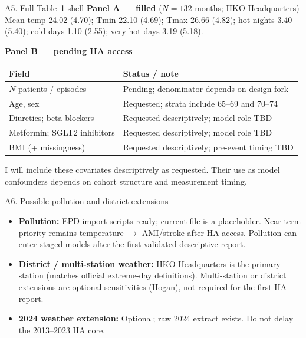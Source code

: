 \documentclass[aspectratio=169,10pt]{beamer}
\begin{document}
\begin{frame}{A5. Full Table~1 shell}
  \footnotesize
  \textbf{Panel A --- filled} ($N=132$ months; HKO Headquarters)\\[0.2em]
  Mean temp 24.02 (4.70); Tmin 22.10 (4.69); Tmax 26.66 (4.82);
  hot nights 3.40 (5.40); cold days 1.10 (2.55); very hot days 3.19 (5.18).

  \vspace{0.55em}
  \textbf{Panel B --- pending HA access}\\[0.2em]
  \begin{tabular}{@{}lp{8.6cm}@{}}
    \toprule
    Field & Status / note \\
    \midrule
    $N$ patients / episodes & Pending; denominator depends on design fork \\
    Age, sex & Requested; strata include 65--69 and 70--74 \\
    Diuretics; beta blockers & Requested descriptively; model role TBD \\
    Metformin; SGLT2 inhibitors & Requested descriptively; model role TBD \\
    BMI (+ missingness) & Requested descriptively; pre-event timing TBD \\
    \bottomrule
  \end{tabular}

  \vspace{0.4em}
  \scriptsize
  I will include these covariates descriptively as requested. Their use as model
  confounders depends on cohort structure and measurement timing.
\end{frame}

\begin{frame}{A6. Possible pollution and district extensions}
  \footnotesize
  \begin{itemize}
    \item \textbf{Pollution:} EPD import scripts ready; current file is a placeholder.
      Near-term priority remains temperature $\rightarrow$ AMI/stroke after HA access.
      Pollution can enter staged models after the first validated descriptive report.
    \item \textbf{District / multi-station weather:} HKO Headquarters is the primary
      station (matches official extreme-day definitions). Multi-station or district
      extensions are optional sensitivities (Hogan), not required for the first HA report.
    \item \textbf{2024 weather extension:} Optional; raw 2024 extract exists.
      Do not delay the 2013--2023 HA core.
  \end{itemize}
\end{frame}
\end{document}
